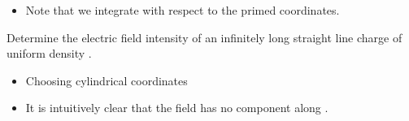 \begin{ELunit}
\begin{itemize}
\begin{itemize}
    \begin{itemize}
    \tightlist
    \item
      Note that we integrate with respect to the primed coordinates.
    \end{itemize}
  \end{itemize}
\end{itemize}

\end{ELunit}


\begin{ELexample}{}

Determine the electric field intensity of an infinitely long straight line charge of uniform density \ELim{\rho_\ell}.


\begin{ELsolution}


\begin{itemize}
\tightlist
\item
  Choosing cylindrical coordinates
\end{itemize}


\begin{itemize}
\tightlist
\item
  It is intuitively clear that the field has no component along .
\end{itemize}


\end{ELsolution}

\end{ELexample}



